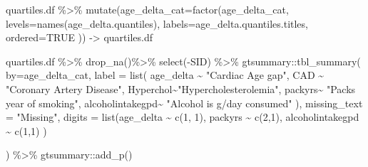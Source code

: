 \documentclass[
]{article}
\newenvironment{Shaded}{\begin{snugshade}}{\end{snugshade}}
\newcommand{\AttributeTok}[1]{\textcolor[rgb]{0.77,0.63,0.00}{#1}}
\newcommand{\ConstantTok}[1]{\textcolor[rgb]{0.00,0.00,0.00}{#1}}
\newcommand{\DecValTok}[1]{\textcolor[rgb]{0.00,0.00,0.81}{#1}}
\newcommand{\FunctionTok}[1]{\textcolor[rgb]{0.00,0.00,0.00}{#1}}
\newcommand{\NormalTok}[1]{#1}
\newcommand{\OtherTok}[1]{\textcolor[rgb]{0.56,0.35,0.01}{#1}}
\newcommand{\SpecialCharTok}[1]{\textcolor[rgb]{0.00,0.00,0.00}{#1}}
\newcommand{\StringTok}[1]{\textcolor[rgb]{0.31,0.60,0.02}{#1}}
\begin{document}
\begin{Shaded}
\begin{Highlighting}[]
\NormalTok{quartiles.df }\SpecialCharTok{\%\textgreater{}\%} 
  \FunctionTok{mutate}\NormalTok{(}\AttributeTok{age\_delta\_cat=}\FunctionTok{factor}\NormalTok{(age\_delta\_cat,}
                              \AttributeTok{levels=}\FunctionTok{names}\NormalTok{(age\_delta.quantiles),}
                              \AttributeTok{labels=}\NormalTok{age\_delta.quantiles.titles,}
                              \AttributeTok{ordered=}\ConstantTok{TRUE}
\NormalTok{         )) }\OtherTok{{-}\textgreater{}}
\NormalTok{  quartiles.df}
\end{Highlighting}
\end{Shaded}

\begin{Shaded}
\begin{Highlighting}[]
\NormalTok{quartiles.df }\SpecialCharTok{\%\textgreater{}\%}
  \FunctionTok{drop\_na}\NormalTok{()}\SpecialCharTok{\%\textgreater{}\%}
  \FunctionTok{select}\NormalTok{(}\SpecialCharTok{{-}}\NormalTok{SID) }\SpecialCharTok{\%\textgreater{}\%} 
\NormalTok{  gtsummary}\SpecialCharTok{::}\FunctionTok{tbl\_summary}\NormalTok{(}
    \AttributeTok{by=}\NormalTok{age\_delta\_cat,}
    \AttributeTok{label  =} \FunctionTok{list}\NormalTok{(}
\NormalTok{      age\_delta   }\SpecialCharTok{\textasciitilde{}} \StringTok{"Cardiac Age gap"}\NormalTok{,}
\NormalTok{      CAD }\SpecialCharTok{\textasciitilde{}} \StringTok{"Coronary Artery Disease"}\NormalTok{,}
\NormalTok{      Hyperchol}\SpecialCharTok{\textasciitilde{}}\StringTok{"Hypercholesterolemia"}\NormalTok{,}
\NormalTok{      packyrs}\SpecialCharTok{\textasciitilde{}} \StringTok{"Packs year of smoking"}\NormalTok{,}
\NormalTok{      alcoholintakegpd}\SpecialCharTok{\textasciitilde{}} \StringTok{"Alcohol is g/day consumed"}
\NormalTok{    ),}
    \AttributeTok{missing\_text =} \StringTok{"Missing"}\NormalTok{,}
    \AttributeTok{digits =} \FunctionTok{list}\NormalTok{(age\_delta }\SpecialCharTok{\textasciitilde{}} \FunctionTok{c}\NormalTok{(}\DecValTok{1}\NormalTok{, }\DecValTok{1}\NormalTok{),}
\NormalTok{                  packyrs }\SpecialCharTok{\textasciitilde{}} \FunctionTok{c}\NormalTok{(}\DecValTok{2}\NormalTok{,}\DecValTok{1}\NormalTok{),}
\NormalTok{                  alcoholintakegpd }\SpecialCharTok{\textasciitilde{}} \FunctionTok{c}\NormalTok{(}\DecValTok{1}\NormalTok{,}\DecValTok{1}\NormalTok{)}
\NormalTok{                  )}
    
\NormalTok{  ) }\SpecialCharTok{\%\textgreater{}\%}
\NormalTok{  gtsummary}\SpecialCharTok{::}\FunctionTok{add\_p}\NormalTok{()}
\end{Highlighting}
\end{Shaded}
\end{document}
